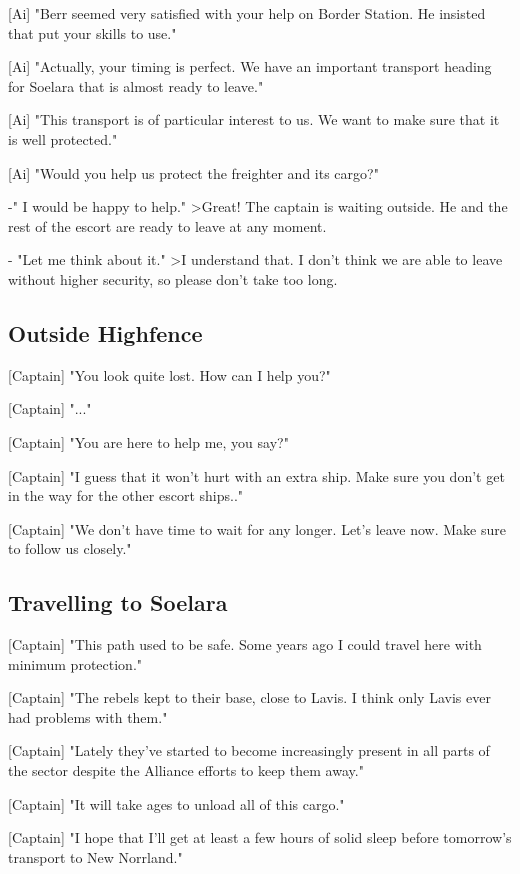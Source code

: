 \documentclass[a4paper,12pt]{article}
\begin{document}
[Ai] "Berr seemed very satisfied with your help on Border Station. He insisted
that put your skills to use."

[Ai] "Actually, your timing is perfect. We have an important transport heading
for Soelara that is almost ready to leave."

[Ai] "This transport is of particular interest to us. We want to make sure that it is well protected."

[Ai] "Would you help us protect the freighter and its cargo?"

-" I would be happy to help."
\textgreater Great! The captain is waiting outside. He and the rest of the escort
are ready to leave at any moment.

- "Let me think about it."
\textgreater I understand that. I don't think we are able to leave without higher
security, so please don't take too long.

\subsection{Outside Highfence}

[Captain] "You look quite lost. How can I help you?"

[Captain] "..."

[Captain] "You are here to help me, you say?" 

[Captain] "I guess that it won't hurt with an extra ship. Make sure you don't get in the way for the other
escort ships.."

[Captain] "We don't have time to wait for any longer. Let's leave now. Make sure to follow
us closely."

\subsection{Travelling to Soelara}

[Captain] "This path used to be safe. Some years ago I could travel here with minimum protection."

[Captain] "The rebels kept to their base, close to Lavis. I think only Lavis ever had problems with them."

[Captain] "Lately they've started to become increasingly present in all parts of the sector
despite the Alliance efforts to keep them away."

[Captain] "It will take ages to unload all of this cargo." 

[Captain] "I hope that I'll get at least a few hours of solid sleep before tomorrow's 
transport to New Norrland."
\end{document}
